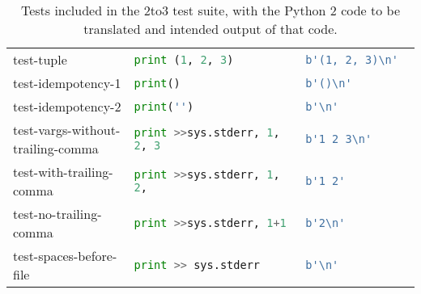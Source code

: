 \begin{table*}[htb]
\begin{tabular}{@{}l|ll@{}}
    test-tuple                           & \lstinline[language=Python, style=pythonstyle]|print (1, 2, 3)                                      | & \lstinline[language=Python, style=pythonstyle]|b'(1, 2, 3)\n'         | \\
    test-idempotency-1                  & \lstinline[language=Python, style=pythonstyle]|print()                                              | & \lstinline[language=Python, style=pythonstyle]|b'()\n'                | \\
    test-idempotency-2                  & \lstinline[language=Python, style=pythonstyle]|print('')                                            | & \lstinline[language=Python, style=pythonstyle]|b'\n'                  | \\
    test-vargs-without-trailing-comma & \lstinline[language=Python, style=pythonstyle]|print >>sys.stderr, 1, 2, 3| & \lstinline[language=Python, style=pythonstyle]|b'1 2 3\n'             | \\
    test-with-trailing-comma           & \lstinline[language=Python, style=pythonstyle]|print >>sys.stderr, 1, 2,  | & \lstinline[language=Python, style=pythonstyle]|b'1 2'                                | \\
    test-no-trailing-comma             & \lstinline[language=Python, style=pythonstyle]|print >>sys.stderr, 1+1    | & \lstinline[language=Python, style=pythonstyle]|b'2\n'                 | \\
    test-spaces-before-file            & \lstinline[language=Python, style=pythonstyle]|print >> sys.stderr          | & \lstinline[language=Python, style=pythonstyle]|b'\n'                  | \\ \bottomrule
    \end{tabular}
    \caption{Tests included in the 2to3 test suite, with the Python 2 code to be translated and intended output of that code.}
    \label{table:tests}
\end{table*}